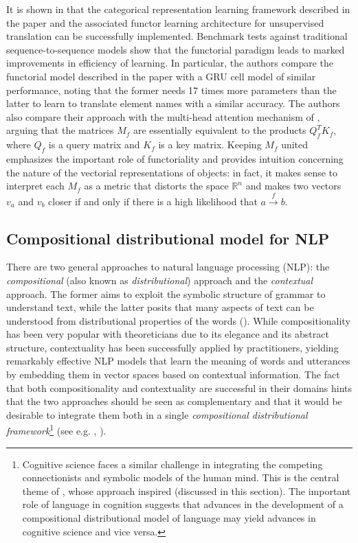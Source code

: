 \documentclass[11pt,a4paper,openright,twoside]{report}
\theoremstyle{plain}
\theoremstyle{definition}
\begin{document}
It is shown in \cite{sheshmani2021categorical} that the categorical representation learning framework described in the paper and the associated functor learning architecture for unsupervised translation can be successfully implemented. Benchmark tests against traditional sequence-to-sequence models show that the functorial paradigm leads to marked improvements in efficiency of learning. In particular, the authors compare the functorial model described in the paper with a GRU cell model of similar performance, noting that the former needs 17 times more parameters than the latter to learn to translate element names with a similar accuracy. The authors also compare their approach with the multi-head attention mechanism of \cite{vaswani2017attention}, arguing that the matrices $M_f$ are essentially equivalent to the products $Q_f^TK_f$, where $Q_f$ is a query matrix and $K_f$ is a key matrix. Keeping $M_f$ united emphasizes the important role of functoriality and provides intuition concerning the nature of the vectorial representations of objects: in fact, it makes sense to interpret each $M_f$ as a metric that distorts the space $\mathbb{R}^n$ and makes two vectors $v_a$ and $v_b$ closer if and only if there is a high likelihood that $a \stackrel{f}{\longrightarrow} b$.

\subsection{Compositional distributional model for NLP}

There are two general approaches to natural language processing (NLP): the \textit{compositional} (also known as \textit{distributional}) approach and the \textit{contextual} approach. The former aims to exploit the symbolic structure of grammar to understand text, while the latter posits that many aspects of text can be understood from distributional properties of the words (\cite{amigo2022information}). While compositionality has been very popular with theoreticians due to its elegance and its abstract structure, contextuality has been successfully applied by practitioners, yielding remarkably effective NLP models that learn the meaning of words and utterances by embedding them in vector spaces based on contextual information. The fact that both compositionality and contextuality are successful in their domains hints that the two approaches should be seen as complementary and that it would be desirable to integrate them both in a single \textit{compositional distributional framework}\footnote{Cognitive science faces a similar challenge in integrating the competing connectionists and symbolic models of the human mind. This is the central theme of \cite{smolensky2006harmonic}, whose approach inspired \cite{clark2007combining} (discussed in this section). The important role of language in cognition suggests that advances in the development of a compositional distributional model of language may yield advances in cognitive science and vice versa.} (see e.g. \cite{amigo2022information}, \cite{maruyama2019compositionality}). 
\end{document}
